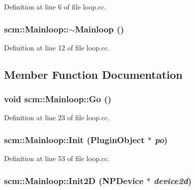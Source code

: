 Definition at line 6 of file loop.cc.

\hypertarget{classscm_1_1_mainloop_a0638591ae4a2df7e99d2ba586ad5edfe}{
\subsubsection[{$\sim$Mainloop}]{\setlength{\rightskip}{0pt plus 5cm}scm::Mainloop::$\sim$Mainloop ()}}
\label{classscm_1_1_mainloop_a0638591ae4a2df7e99d2ba586ad5edfe}


Definition at line 12 of file loop.cc.



\subsection{Member Function Documentation}
\hypertarget{classscm_1_1_mainloop_a7e332605f463847553999278a975d650}{
\subsubsection[{Go}]{\setlength{\rightskip}{0pt plus 5cm}void scm::Mainloop::Go ()}}
\label{classscm_1_1_mainloop_a7e332605f463847553999278a975d650}


Definition at line 23 of file loop.cc.

\hypertarget{classscm_1_1_mainloop_a3b4177ac538fb42bc7bed6bb5e84a6dc}{
\subsubsection[{Init}]{ scm::Mainloop::Init ({\bf PluginObject} $\ast$ {\em po})}}
\label{classscm_1_1_mainloop_a3b4177ac538fb42bc7bed6bb5e84a6dc}


Definition at line 53 of file loop.cc.

\hypertarget{classscm_1_1_mainloop_ab4e2e2a9df321c2761d24690a503cc06}{
\subsubsection[{Init2D}]{ scm::Mainloop::Init2D (NPDevice $\ast$ {\em device2d})}}
\label{classscm_1_1_mainloop_ab4e2e2a9df321c2761d24690a503cc06}


